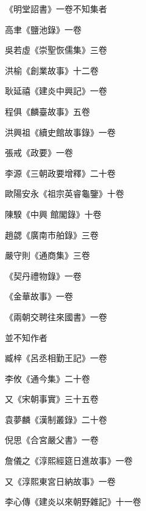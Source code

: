 \begin{pinyinscope}
 《明堂詔書》一卷不知集者



 高聿《鹽池錄》一卷



 吳若虛《崇聖恢儒集》三卷



 洪榆《創業故事》十二卷



 耿延禧《建炎中興記》一卷



 程俱《麟臺故事》五卷



 洪興祖《續史館故事錄》一卷



 張戒《政要》一卷



 李源《三朝政要增釋》二十卷



 歐陽安永《祖宗英睿龜鑒》十卷



 陳騤《中興
 館閣錄》十卷



 趙勰《廣南市舶錄》三卷



 嚴守則《通商集》三卷



 《契丹禮物錄》一卷



 《金華故事》一卷



 《兩朝交聘往來國書》一卷



 並不知作者



 臧梓《呂丞相勤王記》一卷



 李攸《通今集》二十卷



 又《宋朝事實》三十五卷



 袁夢麟《漢制叢錄》二十卷



 倪思《合宮嚴父書》一卷



 詹儀之《淳熙經筵日進故事》一卷



 又《淳熙東宮日納故事》一卷



 李心傳《建炎以來朝野雜記》十一卷




\end{pinyinscope}
